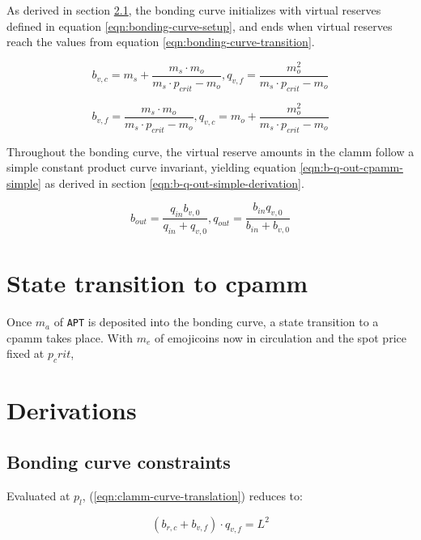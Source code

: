 \documentclass[table, twocolumn]{article}
\begin{document}
As derived in section \ref{sec:bonding-curve-constraints}, the bonding curve initializes
with virtual reserves defined in equation \ref{eqn:bonding-curve-setup}, and ends when
virtual reserves reach the values from equation \ref{eqn:bonding-curve-transition}.

\begin{equation} \label{eqn:bonding-curve-setup}
  b_{v, c} = m_s + \frac{m_s \cdot m_o}{m_s \cdot p_{crit} - m_o},
  q_{v, f} = \frac{m_o ^ 2}{m_s \cdot p_{crit} - m_o}
\end{equation}

\begin{equation} \label{eqn:bonding-curve-transition}
  b_{v, f} = \frac{m_s \cdot m_o}{m_s \cdot p_{crit} - m_o},
  q_{v, c} = m_o + \frac{m_o ^ 2}{m_s \cdot p_{crit} - m_o}
\end{equation}

Throughout the bonding curve, the virtual reserve amounts in the \gls*{clamm} follow a
simple constant product curve invariant, yielding equation
\ref{eqn:b-q-out-cpamm-simple} as derived in section
\ref{eqn:b-q-out-simple-derivation}.

\begin{equation} \label{eqn:b-q-out-cpamm-simple}
  b_{out} = \frac{q_{in} b_{v, 0}}{q_{in} + q_{v, 0}},
  q_{out} = \frac{b_{in} q_{v, 0}}{b_{in} + b_{v, 0}}
\end{equation}

\section{State transition to \gls*{cpamm}}

Once $m_a$ of \texttt{APT} is deposited into the bonding curve, a state transition to
a \gls*{cpamm} takes place. With $m_e$ of emojicoins now in circulation and the spot
price fixed at $p_crit$,

\section{Derivations}

\subsection{Bonding curve constraints} \label{sec:bonding-curve-constraints}

Evaluated at $p_l$, (\ref{eqn:clamm-curve-translation}) reduces to:

\begin{equation} \label{eqn:bonding-curve-1}
  (b_{r, c} + b_{v, f}) \cdot q_{v, f} = L^2
\end{equation}
\end{document}
